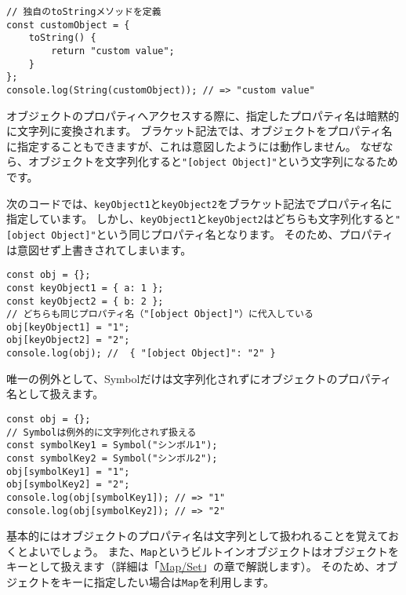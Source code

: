 \begin{lstlisting}
// 独自のtoStringメソッドを定義
const customObject = {
    toString() {
        return "custom value";
    }
};
console.log(String(customObject)); // => "custom value"
\end{lstlisting}

\begin{tcolorbox}[enhanced jigsaw,breakable,title=オブジェクトのプロパティ名は文字列化される]\label{object-property-is-to-string}

オブジェクトのプロパティへアクセスする際に、指定したプロパティ名は暗黙的に文字列に変換されます。
ブラケット記法では、オブジェクトをプロパティ名に指定することもできますが、これは意図したようには動作しません。
なぜなら、オブジェクトを文字列化すると\texttt{"[object Object]"}という文字列になるためです。

次のコードでは、\texttt{keyObject1}と\texttt{keyObject2}をブラケット記法でプロパティ名に指定しています。
しかし、\texttt{keyObject1}と\texttt{keyObject2}はどちらも文字列化すると\texttt{"[object Object]"}という同じプロパティ名となります。
そのため、プロパティは意図せず上書きされてしまいます。

\begin{lstlisting}
const obj = {};
const keyObject1 = { a: 1 };
const keyObject2 = { b: 2 };
// どちらも同じプロパティ名（"[object Object]"）に代入している
obj[keyObject1] = "1";
obj[keyObject2] = "2";
console.log(obj); //  { "[object Object]": "2" }
\end{lstlisting}

唯一の例外として、Symbolだけは文字列化されずにオブジェクトのプロパティ名として扱えます。

\begin{lstlisting}
const obj = {};
// Symbolは例外的に文字列化されず扱える
const symbolKey1 = Symbol("シンボル1");
const symbolKey2 = Symbol("シンボル2");
obj[symbolKey1] = "1";
obj[symbolKey2] = "2";
console.log(obj[symbolKey1]); // => "1"
console.log(obj[symbolKey2]); // => "2"
\end{lstlisting}

基本的にはオブジェクトのプロパティ名は文字列として扱われることを覚えておくとよいでしょう。
また、\texttt{Map}というビルトインオブジェクトはオブジェクトをキーとして扱えます（詳細は「\hyperlink{map-and-set}{Map/Set}」の章で解説します）。
そのため、オブジェクトをキーに指定したい場合は\texttt{Map}を利用します。
\end{tcolorbox}

